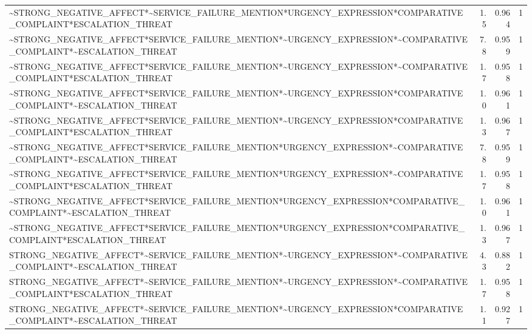 \documentclass[12pt,a4paper]{article}
\begin{document}
\begin{longtable}{lrrr}
    \textasciitilde{}STRONG\_NEGATIVE\_AFFECT*\textasciitilde{}SERVICE\_FAILURE\_MENTION*URGENCY\_EXPRESSION*COMPARATIVE\_COMPLAINT*ESCALATION\_THREAT & 1.5 & 0.964 & 1 \\
    \textasciitilde{}STRONG\_NEGATIVE\_AFFECT*SERVICE\_FAILURE\_MENTION*\textasciitilde{}URGENCY\_EXPRESSION*\textasciitilde{}COMPARATIVE\_COMPLAINT*\textasciitilde{}ESCALATION\_THREAT & 7.8 & 0.959 & 1 \\
    \textasciitilde{}STRONG\_NEGATIVE\_AFFECT*SERVICE\_FAILURE\_MENTION*\textasciitilde{}URGENCY\_EXPRESSION*\textasciitilde{}COMPARATIVE\_COMPLAINT*ESCALATION\_THREAT & 1.7 & 0.958 & 1 \\
    \textasciitilde{}STRONG\_NEGATIVE\_AFFECT*SERVICE\_FAILURE\_MENTION*\textasciitilde{}URGENCY\_EXPRESSION*COMPARATIVE\_COMPLAINT*\textasciitilde{}ESCALATION\_THREAT & 1.0 & 0.961 & 1 \\
    \textasciitilde{}STRONG\_NEGATIVE\_AFFECT*SERVICE\_FAILURE\_MENTION*\textasciitilde{}URGENCY\_EXPRESSION*COMPARATIVE\_COMPLAINT*ESCALATION\_THREAT & 1.3 & 0.967 & 1 \\
    \textasciitilde{}STRONG\_NEGATIVE\_AFFECT*SERVICE\_FAILURE\_MENTION*URGENCY\_EXPRESSION*\textasciitilde{}COMPARATIVE\_COMPLAINT*\textasciitilde{}ESCALATION\_THREAT & 7.8 & 0.959 & 1 \\
    \textasciitilde{}STRONG\_NEGATIVE\_AFFECT*SERVICE\_FAILURE\_MENTION*URGENCY\_EXPRESSION*\textasciitilde{}COMPARATIVE\_COMPLAINT*ESCALATION\_THREAT & 1.7 & 0.958 & 1 \\
    \textasciitilde{}STRONG\_NEGATIVE\_AFFECT*SERVICE\_FAILURE\_MENTION*URGENCY\_EXPRESSION*COMPARATIVE\_COMPLAINT*\textasciitilde{}ESCALATION\_THREAT & 1.0 & 0.961 & 1 \\
    \textasciitilde{}STRONG\_NEGATIVE\_AFFECT*SERVICE\_FAILURE\_MENTION*URGENCY\_EXPRESSION*COMPARATIVE\_COMPLAINT*ESCALATION\_THREAT & 1.3 & 0.967 & 1 \\
    STRONG\_NEGATIVE\_AFFECT*\textasciitilde{}SERVICE\_FAILURE\_MENTION*\textasciitilde{}URGENCY\_EXPRESSION*\textasciitilde{}COMPARATIVE\_COMPLAINT*\textasciitilde{}ESCALATION\_THREAT & 4.3 & 0.882 & 1 \\
    STRONG\_NEGATIVE\_AFFECT*\textasciitilde{}SERVICE\_FAILURE\_MENTION*\textasciitilde{}URGENCY\_EXPRESSION*\textasciitilde{}COMPARATIVE\_COMPLAINT*ESCALATION\_THREAT & 1.7 & 0.958 & 1 \\
    STRONG\_NEGATIVE\_AFFECT*\textasciitilde{}SERVICE\_FAILURE\_MENTION*\textasciitilde{}URGENCY\_EXPRESSION*COMPARATIVE\_COMPLAINT*\textasciitilde{}ESCALATION\_THREAT & 1.1 & 0.927 & 1 \\

\end{longtable}
\end{document}
